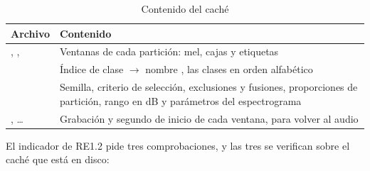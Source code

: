 \begin{table}[htbp]
    \centering
    \caption{Contenido del caché}
    \label{tab:archivos}
    \small
    \begin{tabular}{@{}lL{9.6cm}@{}}
        \toprule
        \textbf{Archivo} & \textbf{Contenido} \\
        \midrule
        , ,  & Ventanas de cada partición: mel, cajas y etiquetas \\
         & Índice de clase $\to$ nombre , las \nClasses{} clases en orden alfabético \\
         & Semilla, criterio de selección, exclusiones y fusiones, proporciones de partición, rango en dB y parámetros del espectrograma \\
        , \ldots & Grabación y segundo de inicio de cada ventana, para volver al audio \\
        \bottomrule
    \end{tabular}
\end{table}

El indicador de RE1.2 pide tres comprobaciones, y las tres se verifican sobre el
caché que está en disco:

